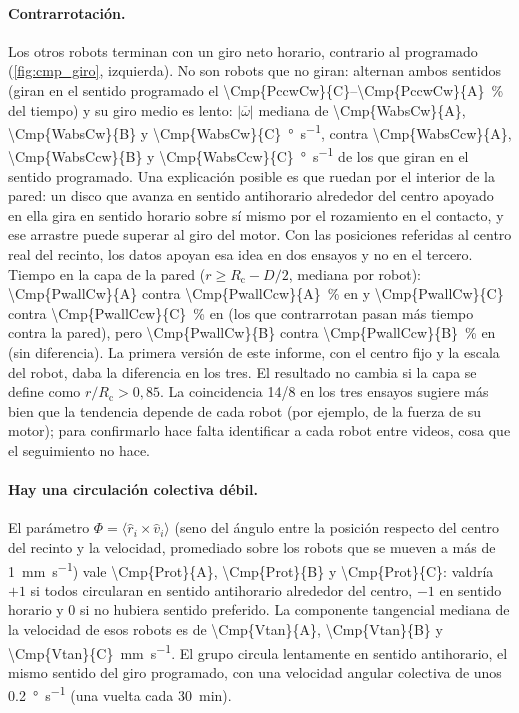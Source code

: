 \paragraph{Contrarrotación.} Los otros  robots terminan con un giro neto horario,
contrario al programado (\cref{fig:cmp_giro}, izquierda). No son robots que no giran: alternan ambos
sentidos (giran en el sentido programado el \num{\Cmp{PccwCw}{C}}--\SI{\Cmp{PccwCw}{A}}{\percent} del
tiempo) y su giro medio es lento: $|\overline{\omega}|$ mediana de \num{\Cmp{WabsCw}{A}},
\num{\Cmp{WabsCw}{B}} y \SI{\Cmp{WabsCw}{C}}{\degree\per\second}, contra \num{\Cmp{WabsCcw}{A}},
\num{\Cmp{WabsCcw}{B}} y \SI{\Cmp{WabsCcw}{C}}{\degree\per\second} de los que giran en el sentido
programado. Una explicación posible es que ruedan por el interior de la pared: un disco que avanza en
sentido antihorario alrededor del centro apoyado en ella gira en sentido horario sobre sí mismo por el
rozamiento en el contacto, y ese arrastre puede superar al giro del motor. Con las posiciones referidas
al centro real del recinto, los datos apoyan esa idea en dos ensayos y no en el tercero. Tiempo en la capa
de la pared ($r \geq R_{\mathrm{c}} - D/2$, mediana por robot): \num{\Cmp{PwallCw}{A}} contra
\SI{\Cmp{PwallCcw}{A}}{\percent} en  y \num{\Cmp{PwallCw}{C}} contra
\SI{\Cmp{PwallCcw}{C}}{\percent} en  (los que contrarrotan pasan más tiempo contra la pared),
pero \num{\Cmp{PwallCw}{B}} contra \SI{\Cmp{PwallCcw}{B}}{\percent} en  (sin diferencia). La
primera versión de este informe, con el centro fijo y la escala del robot, daba la diferencia en los tres.
El resultado no cambia si la capa se define como $r/R_{\mathrm{c}} > 0{,}85$. La coincidencia 14/8 en los
tres ensayos sugiere más bien que la tendencia depende de cada robot (por ejemplo, de la fuerza de su
motor); para confirmarlo hace falta identificar a cada robot entre videos, cosa que el seguimiento no hace.

\paragraph{Hay una circulación colectiva débil.} El parámetro
$\Phi = \langle \hat r_i \times \hat v_i \rangle$ (seno del ángulo entre la posición respecto del
centro del recinto y la velocidad, promediado sobre los robots que se mueven a más de
\SI{1}{\milli\metre\per\second}) vale \num{\Cmp{Prot}{A}}, \num{\Cmp{Prot}{B}} y \num{\Cmp{Prot}{C}}:
valdría $+1$ si todos circularan en sentido antihorario alrededor del centro, $-1$ en sentido horario
y 0 si no hubiera sentido preferido. La componente tangencial mediana de la velocidad de esos robots es
de \num{\Cmp{Vtan}{A}}, \num{\Cmp{Vtan}{B}} y \SI{\Cmp{Vtan}{C}}{\milli\metre\per\second}. El grupo
circula lentamente en sentido antihorario, el mismo sentido del giro programado, con una velocidad angular
colectiva de unos \SI{0.2}{\degree\per\second} (una vuelta cada \SI{30}{\minute}).


